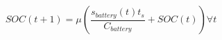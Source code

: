 \begin{equation}
	SOC(t+1) = \mu\left(\frac{s_{battery}(t)t_s}{C_{battery}} + SOC(t)\right) \forall t
	\label{ch1:equ:next-state-of-charge}
\end{equation}